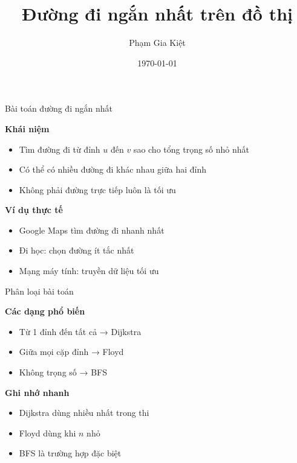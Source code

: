 \documentclass{beamer}
\title{Đường đi ngắn nhất trên đồ thị}
\author{Phạm Gia Kiệt}
\date{\today}
\begin{document}
\frame{\titlepage}

\begin{frame}{Bài toán đường đi ngắn nhất}

\begin{tcolorbox}
\textbf{\faRoute Khái niệm}
\begin{itemize}
\item Tìm đường đi từ đỉnh $u$ đến $v$ sao cho tổng trọng số nhỏ nhất
\item Có thể có nhiều đường đi khác nhau giữa hai đỉnh
\item Không phải đường trực tiếp luôn là tối ưu
\end{itemize}
\end{tcolorbox}

\vspace{0.2cm}

\begin{tcolorbox}
\textbf{\faLightbulb Ví dụ thực tế}
\begin{itemize}
\item Google Maps tìm đường đi nhanh nhất
\item Đi học: chọn đường ít tắc nhất
\item Mạng máy tính: truyền dữ liệu tối ưu
\end{itemize}
\end{tcolorbox}

\end{frame}

\begin{frame}{Phân loại bài toán}

\begin{tcolorbox}
\textbf{\faLayerGroup Các dạng phổ biến}
\begin{itemize}
\item Từ 1 đỉnh đến tất cả → Dijkstra
\item Giữa mọi cặp đỉnh → Floyd
\item Không trọng số → BFS
\end{itemize}
\end{tcolorbox}

\vspace{0.2cm}

\begin{tcolorbox}
\textbf{\faCheckCircle Ghi nhớ nhanh}
\begin{itemize}
\item Dijkstra dùng nhiều nhất trong thi
\item Floyd dùng khi $n$ nhỏ
\item BFS là trường hợp đặc biệt
\end{itemize}
\end{tcolorbox}

\end{frame}
\end{document}
